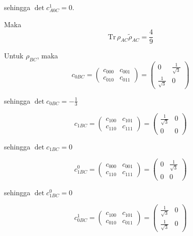 \begin{enumerate}
	sehingga $\det c_{A0C}^1 = 0$.
	
	Maka
	\begin{equation}
		\mathrm{Tr}\,\rho_{AC}\tilde{\rho}_{AC}=\frac{4}{9}
	\end{equation}
	
	Untuk $\rho_{BC}$, maka
	\begin{equation}
		c_{0BC}=
		\begin{pmatrix}
			c_{000} & c_{001} \\
			c_{010} & c_{011}
		\end{pmatrix}=
		\begin{pmatrix}
			0 & \frac{1}{\sqrt{3}} \\
			\frac{1}{\sqrt{3}} & 0
		\end{pmatrix}
	\end{equation}
	
	sehingga $\det c_{0BC} = -\frac{1}{3}$
	
	\begin{equation}
		c_{1BC}=
		\begin{pmatrix}
			c_{100} & c_{101} \\
			c_{110} & c_{111}
		\end{pmatrix}=
		\begin{pmatrix}
			\frac{1}{\sqrt{3}} & 0 \\
			0 & 0
		\end{pmatrix}
	\end{equation}
	
	sehingga $\det c_{1BC} = 0$
	
	\begin{equation}
		c_{1BC}^0=
		\begin{pmatrix}
			c_{000} & c_{001} \\
			c_{110} & c_{111}
		\end{pmatrix}=
		\begin{pmatrix}
			0 & \frac{1}{\sqrt{3}} \\
			0 & 0
		\end{pmatrix}
	\end{equation}
	
	sehingga $\det c_{1BC}^0 = 0$
	
	\begin{equation}
		c_{0BC}^1=
		\begin{pmatrix}
			c_{100} & c_{101} \\
			c_{010} & c_{011}
		\end{pmatrix}=
		\begin{pmatrix}
			\frac{1}{\sqrt{3}} & 0 \\
			\frac{1}{\sqrt{3}} & 0
		\end{pmatrix}
	\end{equation}
	

\end{enumerate}
